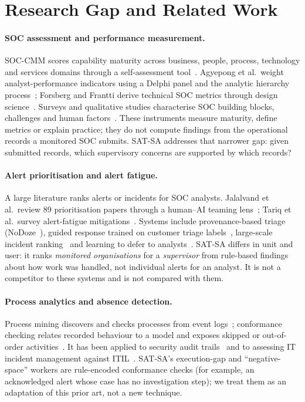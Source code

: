 \section{Research Gap and Related Work}
\label{sec:related}

\paragraph{SOC assessment and performance measurement.}
SOC-CMM scores capability maturity across business, people, process, technology
and services domains through a self-assessment tool~\citep{vanos2016soccmm}.
Agyepong et al.\ weight analyst-performance indicators using a Delphi panel and
the analytic hierarchy process~\citep{agyepong2023analyst}; Forsberg and Frantti
derive technical SOC metrics through design science~\citep{forsberg2023metrics}.
Surveys and qualitative studies characterise SOC building blocks, challenges and
human factors~\citep{vielberth2020soc,kokulu2019soc,sundaramurthy2015burnout,sundaramurthy2016contradictions}.
These instruments measure maturity, define metrics or explain practice; they do
not compute findings from the operational records a monitored SOC submits. SAT-SA
addresses that narrower gap: given submitted records, which supervisory concerns
are supported by which records?

\paragraph{Alert prioritisation and alert fatigue.}
A large literature ranks alerts or incidents for SOC analysts. Jalalvand et
al.\ review 89 prioritisation papers through a human--AI teaming lens~\citep{jalalvand2024prioritisation};
Tariq et al.\ survey alert-fatigue mitigations~\citep{tariq2025alertfatigue}.
Systems include provenance-based triage (NoDoze~\citep{hassan2019nodoze}), guided
response trained on customer triage labels~\citep{freitas2024guide}, large-scale
incident ranking~\citep{freitas2026aip} and learning to defer to analysts~\citep{jalalvand2025l2d}.
SAT-SA differs in unit and user: it ranks \emph{monitored organisations} for a
\emph{supervisor} from rule-based findings about how work was handled, not
individual alerts for an analyst. It is not a competitor to these systems and is
not compared with them.

\paragraph{Process analytics and absence detection.}
Process mining discovers and checks processes from event logs~\citep{vanderaalst2016pm};
conformance checking relates recorded behaviour to a model and exposes skipped or
out-of-order activities~\citep{carmona2018conformance}. It has been applied to
security audit trails~\citep{vanderaalst2005security} and to assessing IT incident
management against ITIL~\citep{ferreira2008itil}. SAT-SA's execution-gap and
``negative-space'' workers are rule-encoded conformance checks (for example, an
acknowledged alert whose case has no investigation step); we treat them as an
adaptation of this prior art, not a new technique.


